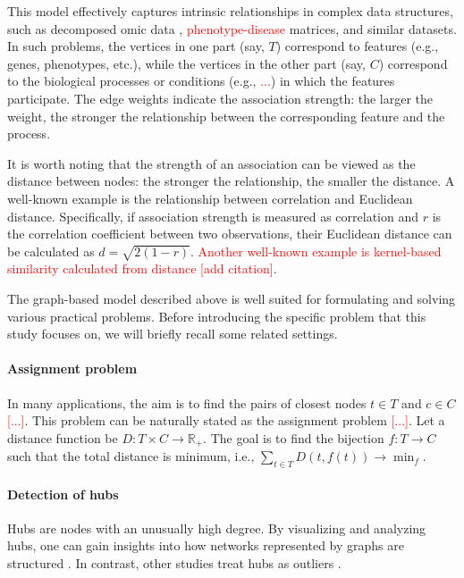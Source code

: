 \documentclass{llncs}
\newcommand{\red}[1]{\textcolor{red}{#1}}
\begin{document}
This model effectively captures intrinsic relationships in complex data structures, such as decomposed omic data \cite{fertig_cogaps_2010, stein-obrien_enter_2018}, \textcolor{red}{phenotype-disease} matrices, and similar datasets. In such problems, the vertices in one part (say, $T$) correspond to features (e.g., genes, phenotypes, etc.), while the vertices in the other part (say, $C$) correspond to the biological processes or conditions (e.g., \textcolor{red}{...}) in which the features participate. The edge weights indicate the association strength: the larger the weight, the stronger the relationship between the corresponding feature and the process.

It is worth noting that the strength of an association can be viewed as the distance between nodes: the stronger the relationship, the smaller the distance. A well-known example is the relationship between correlation and Euclidean distance. Specifically, if association strength is measured as correlation and $r$ is the correlation coefficient between two observations, their Euclidean distance can be calculated as $d = \sqrt{2(1-r)}$. \red{Another well-known example is kernel-based similarity 
calculated from distance [add citation]}. 

The graph-based model described above is well suited for formulating and solving various practical problems. Before introducing the specific problem that this study focuses on, we will briefly recall some related settings.

\paragraph{Assignment problem} In many applications, the aim is to find the pairs of closest nodes $t\in T$ and $c \in C$ \red{[...]}. 
This problem can be naturally stated as the assignment problem \red{[...]}. Let a distance function be $D :T \times C \rightarrow \mathbb{R}_{+} $. The goal is to find the bijection $f: T \rightarrow C$ such that the total distance is minimum, i.e., $\sum_{t\in T}D(t, f(t)) \rightarrow \min_{f}$.

\paragraph{Detection of hubs}
Hubs are nodes with an unusually high degree. By visualizing and analyzing hubs, one can gain insights into how networks represented by graphs are structured \cite{royer2022epilepsy}. In contrast, other studies treat hubs as outliers \cite{kirkley2024identifying}.
\end{document}

